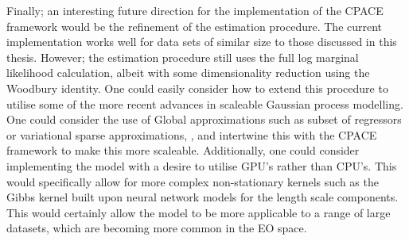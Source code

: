 Finally; an interesting future direction for the implementation of the CPACE framework would be the refinement of the estimation procedure.
The current implementation works well for data sets of similar size to those discussed in this thesis.
However; the estimation procedure still uses the full log marginal likelihood calculation, albeit with some dimensionality reduction using the Woodbury identity.
One could easily consider how to extend this procedure to utilise some of the more recent advances in scaleable Gaussian process modelling.
One could consider the use of Global approximations such as subset of regressors or variational sparse approximations, \citep{liu_when_2020}, and intertwine this with the CPACE framework to make this more scaleable.
Additionally, one could consider implementing the model with a desire to utilise GPU's rather than CPU's.
This would specifically allow for more complex non-stationary kernels such as the Gibbs kernel built upon neural network models for the length scale components.
This would certainly allow the model to be more applicable to a range of large datasets, which are becoming more common in the EO space.
